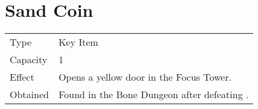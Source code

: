 \section{Sand Coin}
\label{item:sand_coin}


\noindent\begin{tabularx}{\textwidth}[l]{lX}
	Type
	& Key Item
\\ %
	Capacity
	& 1
\\ %
	Effect
	& Opens a yellow door in the Focus Tower.
\\ %
	Obtained
	& Found in the Bone Dungeon after defeating \nameref{monster:flamerus_rex}.
\end{tabularx}
